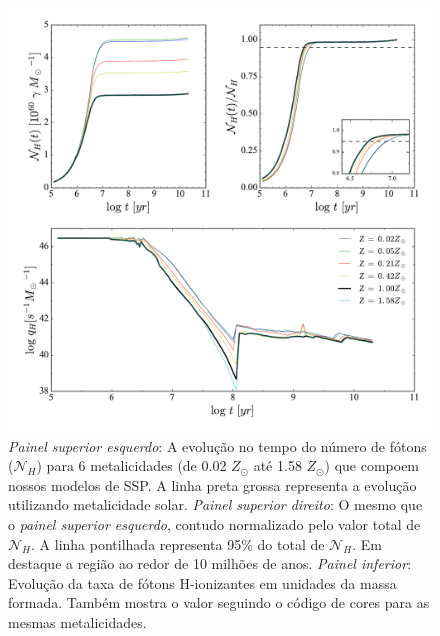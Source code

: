 \begin{figure}
	\centering
	\includegraphics[scale=0.62]{figuras/Nh_logt_metBase_Padova2000_salp.pdf}
	\caption[Evolução temporal do número e da taxa de fótons H-ionizantes em unidades da massa
	formada.]
	{\emph{Painel superior esquerdo}: A	evolução no tempo do número de fótons ($\mathcal{N}_H$) para 6 metalicidades (de 0.02 $Z_\odot$ até 1.58 $Z_\odot$) que compoem nossos modelos de SSP. A linha preta grossa representa a evolução utilizando metalicidade solar. \emph{Painel superior direito}: O mesmo que o \emph{painel superior esquerdo}, contudo normalizado pelo valor total de $\mathcal{N}_H$. A linha pontilhada representa 95\% do total de $\mathcal{N}_H$. Em destaque a região ao redor de 10 milhões de anos. \emph{Painel inferior}: Evolução da taxa de fótons H-ionizantes em unidades da massa formada. Também mostra o valor seguindo o código de cores para as mesmas metalicidades.}
	\label{fig:Nh_qh}
\end{figure}

